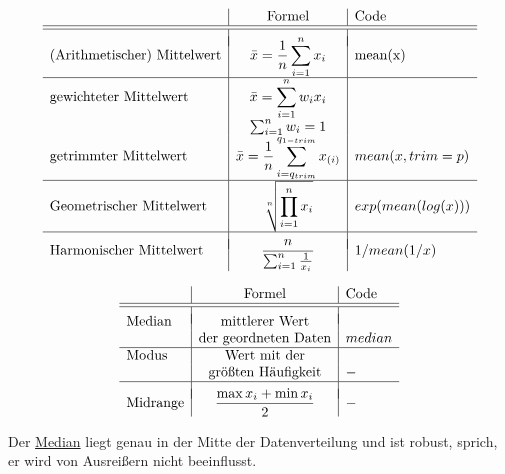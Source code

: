 \documentclass[
]{article}
\begin{document}
\begin{center}
$$
\begin{array}{l|c|l}
&\text{Formel}&\text{Code}\\
\hline
\hline
&&\\[-0.25cm]
\text{(Arithmetischer) Mittelwert} & \displaystyle \bar x =  \frac{1}{n}\sum_{i=1}^n x_i & \text{mean(x)}\\
\hline
\text{gewichteter Mittelwert} &  \displaystyle \bar x = \sum_{i=1}^n w_i x_i & \\
& \sum_{i=1}^n{w_i}=1 & \\
\text{getrimmter Mittelwert} &  \displaystyle \bar x =  \frac{1}{n}\sum_{i=q_{trim}}^{q_{1-trim}} x_{(i)}  & mean(x,trim=p)\\
\hline
\text{Geometrischer Mittelwert} &\displaystyle \sqrt[n]{\prod_{i=1}^n x_i} & exp(mean(log(x))) \\

 

\hline
&&\\[-0.25cm]
\text{Harmonischer Mittelwert} & \displaystyle \frac{n}{\sum_{i=1}^n \frac{1}{x_i}} & 1/mean(1/x) \\
\end{array}  
$$
\end{center}

\endtcolorbox

\tcolorbox

\begin{center}
$$
\begin{array}{l|c|l}
&\text{Formel}&\text{Code}\\
\hline
\hline
&&\\[-0.25cm]
\text{Median} & \text{mittlerer Wert} & \\ & \text{der geordneten Daten}&median\\
\hline
\text{Modus} & \text{Wert mit der} & \\ & \text{größten Häufigkeit} & - \\
\hline
&&\\[-0.25cm]
\text{Midrange} & \displaystyle \frac{\max x_i + \min x_i}{2} &-\\
\end{array} 
$$
\end{center}

\endtcolorbox

\tcolorbox

Der \underline{Median} liegt genau in der Mitte der Datenverteilung und
ist robust, sprich, er wird von Ausreißern nicht beeinflusst.
\end{document}
